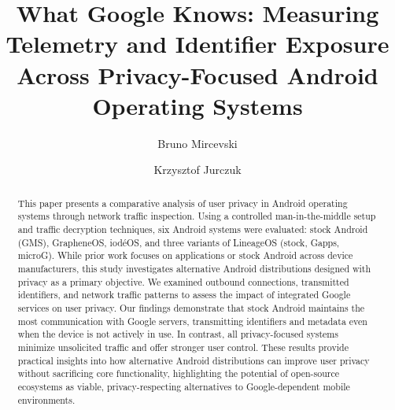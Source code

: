 \documentclass[runningheads]{llncs}
\begin{document}
\title{What Google Knows: Measuring Telemetry and Identifier Exposure Across Privacy-Focused Android Operating Systems}


\author{Bruno Mircevski \and
Krzysztof Jurczuk}



\maketitle

\begin{abstract}
This paper presents a comparative analysis of user privacy in Android operating systems through network traffic inspection. Using a controlled man-in-the-middle setup and traffic decryption techniques, six Android systems were evaluated: stock Android (GMS), GrapheneOS, iod\'eOS, and three variants of LineageOS (stock, Gapps, microG). While prior work focuses on applications or stock Android across device manufacturers, this study investigates alternative Android distributions designed with privacy as a primary objective. We examined outbound connections, transmitted identifiers, and network traffic patterns to assess the impact of integrated Google services on user privacy. Our findings demonstrate that stock Android maintains the most communication with Google servers, transmitting identifiers and metadata even when the device is not actively in use. In contrast, all privacy-focused systems minimize unsolicited traffic and offer stronger user control. These results provide practical insights into how alternative Android distributions can improve user privacy without sacrificing core functionality, highlighting the potential of open-source ecosystems as viable, privacy-respecting alternatives to Google-dependent mobile environments.

\end{abstract}
\end{document}
